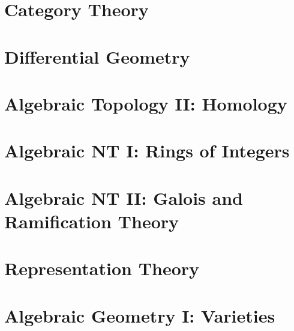\documentclass[11pt,numbers=noenddot]{scrreprt}
\begin{document}
\part{Category Theory}


\part{Differential Geometry}



\part{Algebraic Topology II: Homology}





\part{Algebraic NT I: Rings of Integers}






\part{Algebraic NT II: Galois and Ramification Theory}






\part{Representation Theory}





\part{Algebraic Geometry I: Varieties}



\end{document}
